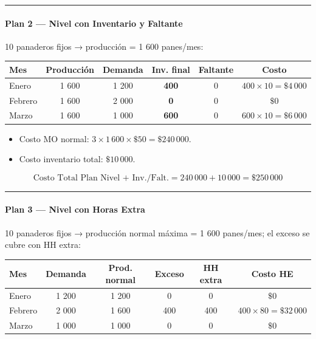 \documentclass[
]{article}
\providecommand{\tightlist}{%
  \setlength{\itemsep}{0pt}\setlength{\parskip}{0pt}}
\begin{document}
\begin{center}\rule{0.5\linewidth}{0.5pt}\end{center}

\hypertarget{plan-2-nivel-con-inventario-y-faltante}{%
\paragraph{Plan 2 --- Nivel con Inventario y
Faltante}\label{plan-2-nivel-con-inventario-y-faltante}}

10 panaderos fijos → producción = 1 600 panes/mes:

\begin{longtable}[]{@{}lccccc@{}}
\toprule\noalign{}
Mes & Producción & Demanda & Inv. final & Faltante & Costo \\
\midrule\noalign{}
\endhead
\bottomrule\noalign{}
\endlastfoot
Enero & 1 600 & 1 200 & \textbf{400} & 0 &
\(400 \times 10 = \$4\,000\) \\
Febrero & 1 600 & 2 000 & \textbf{0} & 0 & \(\$0\) \\
Marzo & 1 600 & 1 000 & \textbf{600} & 0 &
\(600 \times 10 = \$6\,000\) \\
\end{longtable}

\begin{itemize}
\tightlist
\item
  Costo MO normal: \(3 \times 1\,600 \times \$50 = \$240\,000\).
\item
  Costo inventario total: \(\$10\,000\).
\end{itemize}

\[\boxed{\text{Costo Total Plan Nivel + Inv./Falt.} = 240\,000 + 10\,000 = \$250\,000}\]

\begin{center}\rule{0.5\linewidth}{0.5pt}\end{center}

\hypertarget{plan-3-nivel-con-horas-extra}{%
\paragraph{Plan 3 --- Nivel con Horas
Extra}\label{plan-3-nivel-con-horas-extra}}

10 panaderos fijos → producción normal máxima = 1 600 panes/mes; el
exceso se cubre con HH extra:

\begin{longtable}[]{@{}lccccc@{}}
\toprule\noalign{}
Mes & Demanda & Prod. normal & Exceso & HH extra & Costo HE \\
\midrule\noalign{}
\endhead
\bottomrule\noalign{}
\endlastfoot
Enero & 1 200 & 1 200 & 0 & 0 & \(\$0\) \\
Febrero & 2 000 & 1 600 & 400 & 400 & \(400 \times 80 = \$32\,000\) \\
Marzo & 1 000 & 1 000 & 0 & 0 & \(\$0\) \\
\end{longtable}
\end{document}
